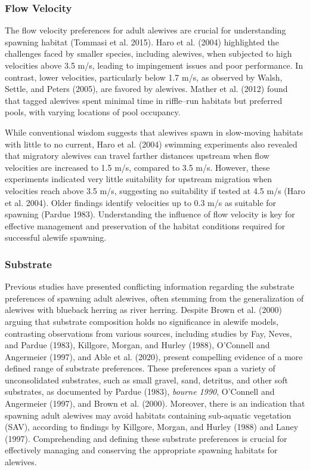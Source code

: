 \documentclass[
]{book}
\begin{document}
\hypertarget{flow-velocity}{%
\subsubsection{Flow Velocity}\label{flow-velocity}}

The flow velocity preferences for adult alewives are crucial for understanding spawning habitat (Tommasi et al. 2015). Haro et al. (2004) highlighted the challenges faced by smaller species, including alewives, when subjected to high velocities above 3.5 m/s, leading to impingement issues and poor performance. In contrast, lower velocities, particularly below 1.7 m/s, as observed by Walsh, Settle, and Peters (2005), are favored by alewives. Mather et al. (2012) found that tagged alewives spent minimal time in riffle--run habitats but preferred pools, with varying locations of pool occupancy.

While conventional wisdom suggests that alewives spawn in slow-moving habitats with little to no current, Haro et al. (2004) swimming experiments also revealed that migratory alewives can travel farther distances upstream when flow velocities are increased to 1.5 m/s, compared to 3.5 m/s. However, these experiments indicated very little suitability for upstream migration when velocities reach above 3.5 m/s, suggesting no suitability if tested at 4.5 m/s (Haro et al. 2004). Older findings identify velocities up to 0.3 m/s as suitable for spawning (Pardue 1983). Understanding the influence of flow velocity is key for effective management and preservation of the habitat conditions required for successful alewife spawning.

\hypertarget{substrate}{%
\subsubsection{Substrate}\label{substrate}}

Previous studies have presented conflicting information regarding the substrate preferences of spawning adult alewives, often stemming from the generalization of alewives with blueback herring as river herring. Despite Brown et al. (2000) arguing that substrate composition holds no significance in alewife models, contrasting observations from various sources, including studies by Fay, Neves, and Pardue (1983), Killgore, Morgan, and Hurley (1988), O'Connell and Angermeier (1997), and Able et al. (2020), present compelling evidence of a more defined range of substrate preferences. These preferences span a variety of unconsolidated substrates, such as small gravel, sand, detritus, and other soft substrates, as documented by Pardue (1983), \emph{bourne 1990}, O'Connell and Angermeier (1997), and Brown et al. (2000). Moreover, there is an indication that spawning adult alewives may avoid habitats containing sub-aquatic vegetation (SAV), according to findings by Killgore, Morgan, and Hurley (1988) and Laney (1997). Comprehending and defining these substrate preferences is crucial for effectively managing and conserving the appropriate spawning habitats for alewives.
\end{document}

